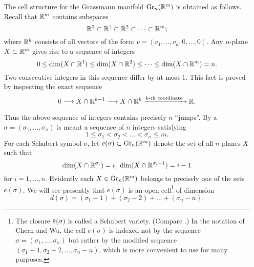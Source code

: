 \documentclass[../main]{subfiles}
\begin{document}
The cell structure for the Grassmann manifold $\operatorname{Gr}_{n}(\mathbb R^{m})$ is obtained as follows. Recall that $\mathbb R^m$ contains subspaces
\[
\mathbb R^{0} \subset \mathbb R^{1} \subset \mathbb R^{2} \subset\dots \subset \mathbb R^m;
\]
where $\mathbb R^{k}$ consists of all vectors of the form $v=(v_{1},\dots, v_{k}, 0,\dots, 0)$. Any $n$-plane $X \subset \mathbb R^m$ gives rise to a sequence of integers
\[
0 \leq \dim(X \cap \mathbb R^{1}) \leq \dim(X \cap \mathbb R^{2}) \leq\dots \leq \dim(X \cap \mathbb R^m)=n.
\]
Two consecutive integers in this sequence differ by at most $1$. This fact is proved by inspecting the exact sequence
\[
0 \varrightarrow{} X \cap \bR^{k-1} \varrightarrow{} X \cap \bR^{k}\varrightarrow{k\text{-th coordinate }}  \bR.
\]
Thus the above sequence of integers contains precisely $n$ ``jumps''. By a  $\sigma=(\sigma_{1},\dots, \sigma_{n})$ is meant a sequence of $n$ integers satisfying
\[
1 \leq \sigma_{1}<\sigma_{2}<\dots<\sigma_{n} \leq m.
\]
For each Schubert symbol $\sigma$, let $e(\sigma) \subset \operatorname{Gr}_{n}(\mathbb R^m)$ denote the set of all $n$-planes $X$ such that
\[
\dim(X \cap \mathbb R^{\sigma_{i}})=i,\; \dim(X \cap \mathbb R^{\sigma_{i}-1})=i-1
\]
for $i=1,\dots, n$. Evidently each $X \in \operatorname{Gr}_{n}(\mathbb R^m)$ belongs to precisely one of the sets $e(\sigma)$. We will see presently that $e(\sigma)$ is an open cell\footnote{The closure $\xoverline{e}(\sigma)$ is called a Schubert variety. (Compare  \cite{schubert}.) In the notation of Chern and Wu, the cell $e(\sigma)$ is indexed not by the sequence $\sigma=(\sigma_{1},\dots, \sigma_{n})$ but rather by the modified sequence $(\sigma_{1}-1, \sigma_{2}-2,\dots, \sigma_{n}-n)$, which is more convenient to use for many purposes.}
of dimension \[d(\sigma)=(\sigma_{1}-1)+(\sigma_{2}-2)+\dots+(\sigma_{n}-n).\]
\end{document}
